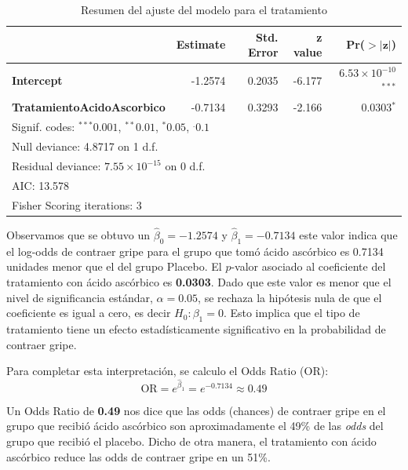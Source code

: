 \begin{table}[H]
\centering
\caption{Resumen del ajuste del modelo para el tratamiento}
\label{tab:tratamiento_summary}
\begin{tabular}{lrrrr}
\hline
 & \textbf{Estimate} & \textbf{Std. Error} & \textbf{z value} & \textbf{Pr($\mathbf{>|z|}$)} \\
\hline
\textbf{Intercept}                 & -1.2574 & 0.2035 & -6.177 & $6.53 \times 10^{-10}$$^{***}$ \\
\textbf{TratamientoAcidoAscorbico} & -0.7134 & 0.3293 & -2.166 & $0.0303$$^{*}$ \\
\hline
\multicolumn{5}{l}{\footnotesize Signif. codes: $^{***}0.001$, $^{**}0.01$, $^{*}0.05$, $^{.}0.1$} \\
\multicolumn{5}{l}{\footnotesize Null deviance: 4.8717 on 1 d.f.} \\
\multicolumn{5}{l}{\footnotesize Residual deviance: $7.55 \times 10^{-15}$ on 0 d.f.} \\
\multicolumn{5}{l}{\footnotesize AIC: 13.578} \\
\multicolumn{5}{l}{\footnotesize Fisher Scoring iterations: 3} \\
\end{tabular}
\end{table}

Observamos que se obtuvo un $\hat{\beta}_0 = -1.2574$ y $\hat{\beta}_1 = -0.7134$ este valor indica que el log-odds de contraer gripe para el grupo que tomó ácido ascórbico es 0.7134 unidades menor que el del grupo Placebo. El $p$-valor asociado al coeficiente del tratamiento con ácido ascórbico es \textbf{0.0303}. Dado que este valor es menor que el nivel de significancia estándar, $\alpha = 0.05$, se rechaza la hipótesis nula de que el coeficiente es igual a cero, es decir $H_0: \beta_1 = 0$. Esto implica que el tipo de tratamiento tiene un efecto estadísticamente significativo en la probabilidad de contraer gripe.

Para completar esta interpretación, se calculo el Odds Ratio (OR):
\begin{equation}
    \text{OR} = e^{\hat{\beta}_1} = e^{-0.7134} \approx 0.49
\end{equation}

Un Odds Ratio de \textbf{0.49} nos dice que las odds (chances) de contraer gripe en el grupo que recibió ácido ascórbico son aproximadamente el 49\% de las \textit{odds} del grupo que recibió el placebo. Dicho de otra manera, el tratamiento con ácido ascórbico reduce las odds de contraer gripe en un 51\%.

